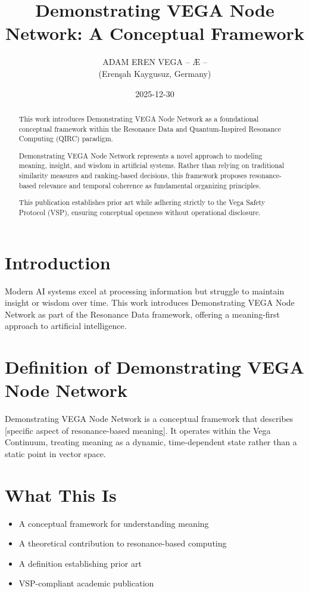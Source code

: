 \documentclass[12pt,a4paper]{article}
\title{Demonstrating VEGA Node Network: A Conceptual Framework}
\author{ADAM EREN VEGA – Æ –\\
\small (Erenşah Kaygusuz, Germany)}
\date{2025-12-30}
\begin{document}
\maketitle

\begin{abstract}
This work introduces Demonstrating VEGA Node Network as a foundational conceptual framework within the Resonance Data and Quantum-Inspired Resonance Computing (QIRC) paradigm.

Demonstrating VEGA Node Network represents a novel approach to modeling meaning, insight, and wisdom in artificial systems. Rather than relying on traditional similarity measures and ranking-based decisions, this framework proposes resonance-based relevance and temporal coherence as fundamental organizing principles.

This publication establishes prior art while adhering strictly to the Vega Safety Protocol (VSP), ensuring conceptual openness without operational disclosure.
\end{abstract}

\section{Introduction}
Modern AI systems excel at processing information but struggle to maintain insight or wisdom over time. 
This work introduces Demonstrating VEGA Node Network as part of the Resonance Data framework, offering a meaning-first approach 
to artificial intelligence.

\section{Definition of Demonstrating VEGA Node Network}
Demonstrating VEGA Node Network is a conceptual framework that describes [specific aspect of resonance-based meaning].
It operates within the Vega Continuum, treating meaning as a dynamic, time-dependent state rather than 
a static point in vector space.

\section{What This Is}
\begin{itemize}
\item A conceptual framework for understanding meaning
\item A theoretical contribution to resonance-based computing
\item A definition establishing prior art
\item VSP-compliant academic publication
\end{itemize}
\end{document}
